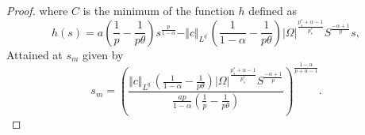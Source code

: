 \documentclass[10pt,twoside,reqno,centertags,draft]{amsart}
\begin{document}
\begin{proof}
{}
where $ C$ is the minimum of the function $ h$ defined as 
\begin{equation*}
h(s) =a\left( \frac{1}{p} -\frac{1}{p\theta}\right)s^{\frac{p}{1 -\alpha}} -\Vert c \Vert_{L^{q^{\prime}}}\left(\frac{1}{1 -\alpha} - \frac{1}{p\theta} \right)\vert \Omega \vert^{\frac{p_s^* +\alpha -1}{p_s^*}}S^{\frac{-\alpha+1}{p}}s,
\end{equation*}
Attained at $ s_m$ given by
\begin{equation*}
s_m =\left( \frac{\Vert c \Vert_{L^{q^{\prime}}}\left(\frac{1}{1 -\alpha} - \frac{1}{p\theta} \right)\vert \Omega \vert^{\frac{p_s^* +\alpha -1}{p_s^*}}S^{\frac{-\alpha+1}{p}}}{\frac{a p}{1 -\alpha}\left( \frac{1}{p} -\frac{1}{p\theta}\right)} \right)^{\frac{1- \alpha}{p +\alpha -1}}.
\end{equation*}
\end{proof}
\end{document}
